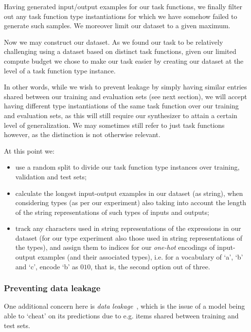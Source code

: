 \documentclass{article}
\begin{document}
Having generated input/output examples for our task functions,
we finally filter out any task function type instantiations for which we have somehow failed to generate such samples.
We moreover limit our dataset to a given maximum.

Now we may construct our dataset.
As we found our task to be relatively challenging using a dataset based on distinct task functions,
given our limited compute budget we chose to make our task easier by creating our dataset at the level of a task function type instance.

In other words, while we wish to prevent leakage by simply having similar entries shared between our training and evaluation sets (see next section),
we will accept having different type instantiations of the same task function over our training and evaluation sets,
as this will still require our synthesizer to attain a certain level of generalization.
We may sometimes still refer to just task functions however, as the distinction is not otherwise relevant.

At this point we:
\begin{itemize}
    \item use a random split to divide our task function type instances over training, validation and test sets;
    \item calculate the longest input-output examples in our dataset (as string), when considering types (as per our experiment) also taking into account the length of the string representations of such types of inputs and outputs;
    \item track any characters used in string representations of the expressions in our dataset
    (for our type experiment also those used in string representations of the types),
    and assign them to indices for our \emph{one-hot} encodings of input-output examples (and their associated types),
    i.e. for a vocabulary of `a', `b' and `c', encode `b' as $010$,
    that is, the second option out of three.
\end{itemize}

\subsubsection{Preventing data leakage}

One additional concern here is \emph{data leakage}~\citep{leakage},
which is the issue of a model being able to `cheat' on its predictions due to e.g. items shared between training and test sets.
\end{document}
